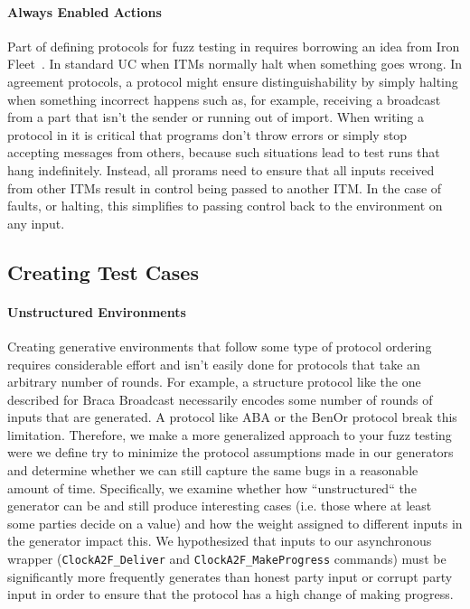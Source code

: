 \paragraph{Always Enabled Actions}
Part of defining protocols for fuzz testing in \us requires borrowing an idea from Iron Fleet~\cite{ironfleet}.
In standard UC when ITMs normally halt when something goes wrong.
In agreement protocols, a protocol might ensure distinguishability by simply halting when something incorrect happens such as, for example, receiving a broadcast from a part that isn't the sender or running out of import. 
When writing a protocol in \us it is critical that programs don't throw errors or simply stop accepting messages from others, because such situations lead to test runs that hang indefinitely. 
Instead, all prorams need to ensure that all inputs received from other ITMs result in control being passed to another ITM.
In the case of faults, or halting, this simplifies to passing control back to the environment on any input.  


\subsection{Creating Test Cases}

\paragraph{Unstructured Environments}
Creating generative environments that follow some type of protocol ordering requires considerable effort and isn't easily done for protocols that take an arbitrary number of rounds.
For example, a structure protocol like the one described for Braca Broadcast necessarily encodes some number of rounds of inputs that are generated. 
A protocol like ABA or the BenOr protocol break this limitation. 
Therefore, we make a more generalized approach to your fuzz testing were we define try to minimize the protocol assumptions made in our generators and determine
whether we can still capture the same bugs in a reasonable amount of time.
Specifically, we examine whether how ``unstructured`` the generator can be and still produce interesting cases (i.e. those where at least some parties decide on a value) and 
how the weight assigned to different inputs in the generator impact this.
We hypothesized that inputs to our asynchronous wrapper (\texttt{ClockA2F\_Deliver} and \texttt{ClockA2F\_MakeProgress} commands) must be significantly more frequently generates
than honest party input or corrupt party input in order to ensure that the protocol has a high change of making progress.





